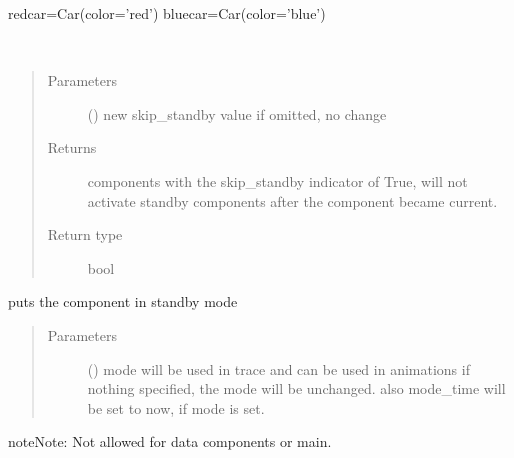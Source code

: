 \documentclass[letterpaper,10pt,english]{sphinxmanual}
\begin{document}
\begin{fulllineitems}
\begin{fulllineitems}
\begin{description}
\end{description}

redcar=Car(color=’red’) 
bluecar=Car(color=’blue’)

\end{fulllineitems}


\begin{fulllineitems}
\label{\detokenize{Reference:salabim.Component.skip_standby}}~\begin{quote}\begin{description}
\item[{Parameters}] \leavevmode
{} () \textendash{} new skip\_standby value 
if omitted, no change

\item[{Returns}] \leavevmode
{} \textendash{} components with the skip\_standby indicator of True, will not activate standby components after
the component became current.

\item[{Return type}] \leavevmode
bool

\end{description}\end{quote}

\end{fulllineitems}


\begin{fulllineitems}
\label{\detokenize{Reference:salabim.Component.standby}}
puts the component in standby mode
\begin{quote}\begin{description}
\item[{Parameters}] \leavevmode
{} () \textendash{} mode 
will be used in trace and can be used in animations 
if nothing specified, the mode will be unchanged. 
also mode\_time will be set to now, if mode is set.

\end{description}\end{quote}

\begin{sphinxadmonition}{note}{Note:}
Not allowed for data components or main.


\end{sphinxadmonition}
\end{fulllineitems}
\end{fulllineitems}
\end{document}
